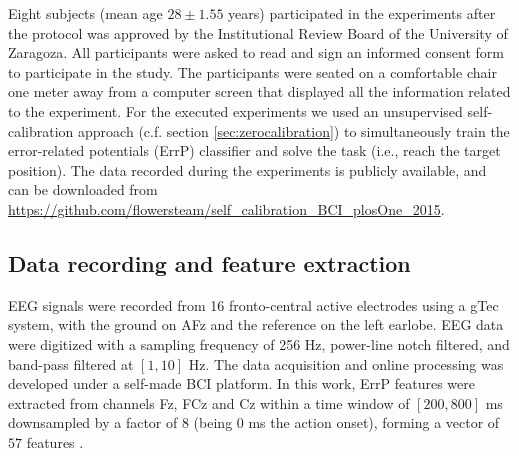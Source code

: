 Eight subjects (mean age $28 \pm 1.55$ years) participated in the experiments after the protocol was approved by the Institutional Review Board of the University of Zaragoza. All participants were asked to read and sign an informed consent form to participate in the study. The participants were seated on a comfortable chair one meter away from a computer screen that displayed all the information related to the experiment. 
%
%
For the executed experiments we used an unsupervised self-calibration approach (c.f. section \ref{sec:zerocalibration}) to simultaneously train the error-related potentials (ErrP) \cite{chavarriaga2014errare} classifier  and solve the task (i.e., reach the target position). The data recorded during the experiments is publicly available, and can be downloaded from \url{https://github.com/flowersteam/self_calibration_BCI_plosOne_2015}.

\subsection{Data recording and feature extraction}

EEG signals were recorded from 16 fronto-central active electrodes using a gTec system, with the ground on AFz and the reference on the left earlobe. EEG data were digitized with a sampling frequency of 256 Hz, power-line notch filtered, and band-pass filtered at $[1, 10]$ Hz. The data acquisition and online processing was developed under a self-made BCI platform. 
%
In this work, ErrP features were extracted from channels Fz, FCz and Cz within a time window of $[200,800]$ ms downsampled by a factor of 8 (being 0 ms the action onset), forming a vector of $57$ features \cite{chavarriaga2010learning}. 



